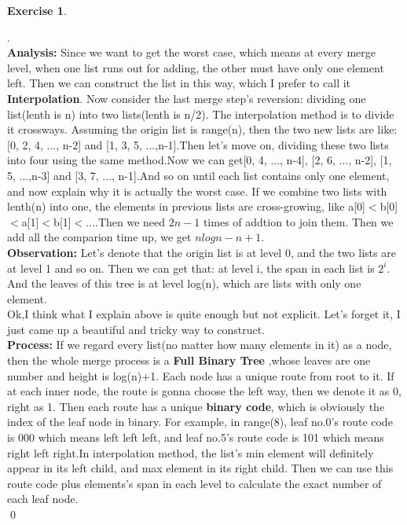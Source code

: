 \documentclass[12pt, notitlepage]{article}
\newtheorem{ex}{Exercise}
\newenvironment{sol}
  {\par\vspace{3mm}\noindent{\it Solution}.}{\qed}
\begin{document}
\begin{ex}\end{ex}
\begin{sol}\\
\textbf{Analysis:} Since we want to get the worst case, which means at every merge level, when one list runs out for adding, the other must have only one element left. Then we can construct the list in this way, which I prefer to call it \textbf{Interpolation}. Now consider the last merge step's reversion: dividing one list(lenth is n) into two lists(lenth is n/2). The interpolation method is to divide it crossways. Assuming the origin list is range(n), then the two new lists are like: [0, 2, 4, ..., n-2] and [1, 3, 5, ...,n-1].Then let's move on, dividing these two lists into four using the same method.Now we can get[0, 4, ..., n-4], [2, 6, ..., n-2], [1, 5, ...,n-3] and [3, 7, ..., n-1].And so on until each list contains only one element, and now explain why it is actually the worst case. If we combine two lists with lenth(n) into one, the elements in previous lists are cross-growing, like a[0]$<$b[0]$<$a[1]$<$b[1]$<$....Then we need $2n-1$ times of addtion to join them. Then we add all the comparion time up, we get $nlogn-n+1$.\\
\textbf{Observation:} Let's denote that the origin list is at level 0, and the two lists are at level 1 and so on. Then we can get that: at level i, the span in each list is $2^i$. And the leaves of this tree is at level log(n), which are lists with only one element.\\
Ok,I think what I explain above is quite enough but not explicit. Let's forget it, I just came up a beautiful and tricky way to construct.\\
\textbf{Process:} If we regard every list(no matter how many elements in it) as a node, then the whole merge process is a \textbf{Full Binary Tree} ,whose leaves are one number and height is log(n)+1. Each node has a unique route from root to it. If at each inner node, the route is gonna choose the left way, then we denote it as 0, right as 1. Then each route has a unique \textbf{binary code}, which is obviously the index of the leaf node in binary. For example, in range(8), leaf no.0's route code is 000 which means left left left, and leaf no.5's route code is 101 which means right left right.In interpolation method, the list's min element will definitely appear in its left child, and max element in its right child. Then we can use this route code plus elements's span in each level to calculate the exact number of each leaf node.\\

\end{sol}
\end{document}
